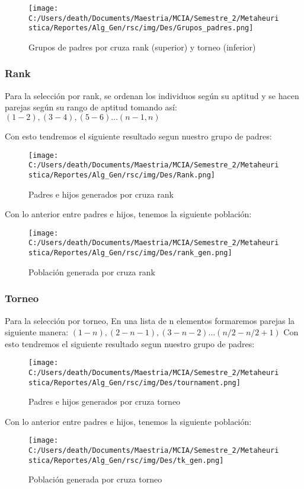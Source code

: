 \begin{figure} [H]
    \centering
    \texttt{[image: C:/Users/death/Documents/Maestria/MCIA/Semestre\_2/Metaheuristica/Reportes/Alg\_Gen/rsc/img/Des/Grupos\_padres.png]}
    \caption{Grupos de padres por cruza rank (superior) y torneo (inferior)}\label{Selec}
\end{figure}

\subsubsection{Rank}
Para la selección por rank, se ordenan los individuos según su aptitud y se hacen parejas según su rango de aptitud tomando así:  
$(1 - 2), (3 - 4), (5 - 6)\dots(n-1, n)$

Con esto tendremos el siguiente resultado segun nuestro grupo de padres:
\begin{figure} [H]
    \centering
    \texttt{[image: C:/Users/death/Documents/Maestria/MCIA/Semestre\_2/Metaheuristica/Reportes/Alg\_Gen/rsc/img/Des/Rank.png]}
    \caption{Padres e hijos generados por cruza rank}\label{Rank}
\end{figure}

Con lo anterior entre padres e hijos, tenemos la siguiente población:
\begin{figure} [H]
    \centering
    \texttt{[image: C:/Users/death/Documents/Maestria/MCIA/Semestre\_2/Metaheuristica/Reportes/Alg\_Gen/rsc/img/Des/rank\_gen.png]}
    \caption{Población generada por cruza rank}\label{Pob_rank}
\end{figure}

\subsubsection{Torneo}
Para la selección por torneo, En una lista de n elementos formaremos parejas la siguiente manera:  
$(1 - n), (2 - n-1), (3 - n-2) \dots (n/2 - n/2 + 1)$
Con esto tendremos el siguiente resultado segun nuestro grupo de padres:

\begin{figure} [H]
    \centering
    \texttt{[image: C:/Users/death/Documents/Maestria/MCIA/Semestre\_2/Metaheuristica/Reportes/Alg\_Gen/rsc/img/Des/tournament.png]}
    \caption{Padres e hijos generados por cruza torneo}\label{Torneo}
\end{figure}

Con lo anterior entre padres e hijos, tenemos la siguiente población:
\begin{figure} [H]  
    \centering
    \texttt{[image: C:/Users/death/Documents/Maestria/MCIA/Semestre\_2/Metaheuristica/Reportes/Alg\_Gen/rsc/img/Des/tk\_gen.png]}
    \caption{Población generada por cruza torneo}\label{Pob_torneo}
\end{figure}

